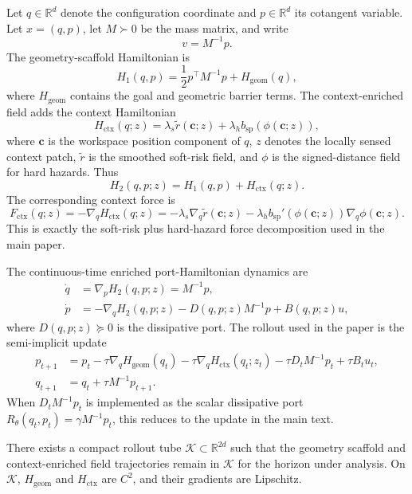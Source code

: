 Let \(q \in \mathbb R^d\) denote the configuration coordinate and \(p\in\mathbb R^d\)
its cotangent variable. Let \(x=(q,p)\), let \(M\succ 0\) be the mass matrix, and
write
\[
    v = M^{-1}p .
\]
The geometry-scaffold Hamiltonian is
\[
    H_1(q,p)
    =
    \frac12 p^\top M^{-1}p + H_{\mathrm{geom}}(q),
\]
where \(H_{\mathrm{geom}}\) contains the goal and geometric barrier terms. The context-enriched field
adds the context Hamiltonian
\[
    H_{\mathrm{ctx}}(q;z)
    =
    \lambda_s \widetilde r(\mathbf c;z)
    +
    \lambda_h b_{\mathrm{sp}}(\phi(\mathbf c;z)),
\]
where \(\mathbf c\) is the workspace position component of \(q\), \(z\) denotes the
locally sensed context patch, \(\widetilde r\) is the smoothed soft-risk field, and
\(\phi\) is the signed-distance field for hard hazards. Thus
\[
    H_2(q,p;z)
    =
    H_1(q,p)+H_{\mathrm{ctx}}(q;z).
\]
The corresponding context force is
\[
    F_{\mathrm{ctx}}(q;z)
    =
    -\nabla_q H_{\mathrm{ctx}}(q;z)
    =
    -\lambda_s \nabla_q \widetilde r(\mathbf c;z)
    -
    \lambda_h b_{\mathrm{sp}}'(\phi(\mathbf c;z))\nabla_q \phi(\mathbf c;z).
\]
This is exactly the soft-risk plus hard-hazard force decomposition used in the main
paper.

The continuous-time enriched port-Hamiltonian dynamics are
\begin{align}
    \dot q &= \nabla_p H_2(q,p;z)=M^{-1}p, \label{eq:ct_q}\\
    \dot p &=
    -\nabla_q H_2(q,p;z)
    -
    D(q,p;z)M^{-1}p
    +
    B(q,p;z)u , \label{eq:ct_p}
\end{align}
where \(D(q,p;z)\succeq 0\) is the dissipative port. The rollout used in the paper is
the semi-implicit update
\begin{align}
    p_{t+1}
    &=
    p_t
    -\tau\nabla_q H_{\mathrm{geom}}(q_t)
    -\tau\nabla_q H_{\mathrm{ctx}}(q_t;z_t)
    -\tau D_tM^{-1}p_t
    +\tau B_tu_t, \label{eq:disc_p}\\
    q_{t+1}
    &=
    q_t+\tau M^{-1}p_{t+1}. \label{eq:disc_q}
\end{align}
When \(D_tM^{-1}p_t\) is implemented as the scalar dissipative port
\(R_\theta(q_t,p_t)=\gamma M^{-1}p_t\), this reduces to the update in the main text.

\begin{assumption}
\label{ass:regularity}
There exists a compact rollout tube \(\mathcal K\subset \mathbb R^{2d}\) such that
the geometry scaffold and context-enriched field trajectories remain in \(\mathcal K\) for the horizon under
analysis. On \(\mathcal K\), \(H_{\mathrm{geom}}\) and \(H_{\mathrm{ctx}}\) are \(C^2\),
and their gradients are Lipschitz.
\end{assumption}

